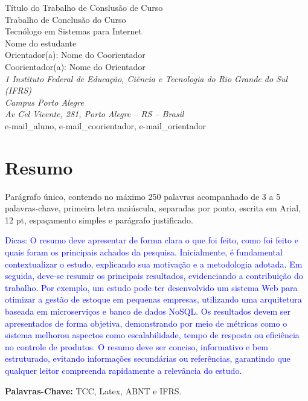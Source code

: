\documentclass[
	article,			%
	11pt,				%
	oneside,			%
	a4paper,			%
	english,			%
	brazil,				%
	sumario=tradicional
]{abntex2}
\begin{document}
\thispagestyle{fancy}
\pagestyle{fancy}

\begin{center}
    {\LARGE Título do Trabalho de Conslusão de Curso}\\[0.8cm]
    {\large Trabalho de Conclusão do Curso}\\
    {\large Tecnólogo em Sistemas para Internet}\\[1cm]
    {\large Nome do estudante}\\
    Orientador(a): Nome do Coorientador\\
    Coorientador(a): Nome do Orientador\\[0.8cm]
    \textit{1 Instituto Federal de Educação, Ciência e Tecnologia do Rio
    Grande do Sul (IFRS)\\
    Campus Porto Alegre\\
    Av Cel Vicente, 281, Porto Alegre – RS – Brasil}\\
    e-mail\_aluno, e-mail\_coorientador, e-mail\_orientador
\end{center}

\section*{Resumo}
Parágrafo único, contendo no máximo 250 palavras acompanhado de 3 a 5
palavras-chave, primeira letra maiúscula, separadas por ponto, escrita em
Arial, 12 pt, espaçamento simples e parágrafo justificado.

\textcolor{blue}{
Dicas: O resumo deve apresentar de forma clara o que foi feito, como foi feito e
quais foram os principais achados da pesquisa. Inicialmente, é fundamental
contextualizar o estudo, explicando sua motivação e a metodologia adotada. Em
seguida, deve-se resumir os principais resultados, evidenciando a contribuição
do trabalho. Por exemplo, um estudo pode ter desenvolvido um sistema Web para
otimizar a gestão de estoque em pequenas empresas, utilizando uma arquitetura
baseada em microserviços e banco de dados NoSQL. Os resultados devem ser
apresentados de forma objetiva, demonstrando por meio de métricas como o sistema
melhorou aspectos como escalabilidade, tempo de resposta ou eficiência no
controle de produtos. O resumo deve ser conciso, informativo e bem estruturado,
evitando informações secundárias ou referências, garantindo que qualquer leitor
compreenda rapidamente a relevância do estudo.
}

\noindent\textbf{Palavras-Chave:} TCC, Latex, ABNT e IFRS.
\end{document}
